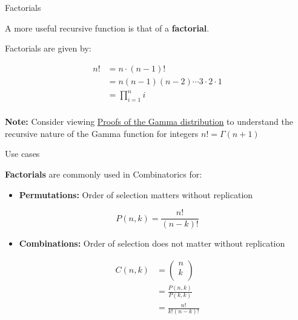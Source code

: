 \begin{frame}{Factorials}

A more useful recursive function is that of a \textbf{factorial}.

Factorials are given by:

\[\begin{aligned}
  n! &= n \cdot \left( {n - 1} \right)!  \\
   &= n\left( {n - 1} \right)\left( {n - 2} \right) \cdots 3 \cdot 2 \cdot 1  \\
   &= \prod\limits_{i = 1}^n i   \\ 
\end{aligned}\]

\textbf{Note:} Consider viewing
\href{http://thecoatlessprofessor.com/statistics/proofs-of-gamma-distribution/}{Proofs
of the Gamma distribution} to understand the recursive nature of the
Gamma function for integers \(n! = \Gamma \left( {n + 1} \right)\)

\end{frame}

\begin{frame}{Use cases}

\textbf{Factorials} are commonly used in Combinatorics for:

\begin{itemize}
\tightlist
\item
  \textbf{Permutations:} Order of selection matters without replication
\end{itemize}

\[P\left( {n,k} \right) = \frac{ {n!} }{ {\left( {n - k} \right)!} }\]

\begin{itemize}
\tightlist
\item
  \textbf{Combinations:} Order of selection does not matter without
  replication
\end{itemize}

\[\begin{aligned}
C\left( {n,k} \right) &=\left( \begin{gathered}
  n  \\
  k  \\ 
\end{gathered}  \right) \\
&=  \frac{ {P\left( {n,k} \right)} }{ {P\left( {k,k} \right)} } \\
&= \frac{ {n!} }{ {k!\left( {n - k} \right)!} }
\end{aligned}\]

\end{frame}

